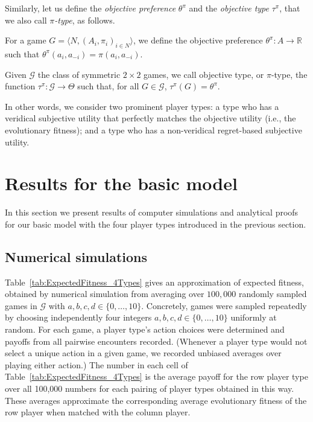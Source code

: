 \documentclass[fleqn,reqno,11pt]{article}
\begin{document}
\noindent Similarly, let us define the \textit{objective preference} $\theta^{\pi}$ and the \textit{objective type} $ \tau^{\pi} $, that we also call $\pi$\textit{-type}, as follows. 

\begin{definition} \label{defn:objpref}

For a game $ G=\langle N, (A_i , \pi_i)_{i \in N} \rangle $, we define the objective preference $ \theta^{\pi}: A \rightarrow \mathbb{R} $ such that $ \theta^{\pi}(a_i,a_{-i})=\pi(a_i,a_{-i}) $.

\end{definition}


\begin{definition} \label{defn:objtype}

Given $ \mathcal{G} $ the class of symmetric $ 2 \times 2 $ games, we call objective type, or $\pi$-type, the function $\tau^{\pi}: \mathcal{G} \rightarrow  \Theta$ such that, for all $G \in \mathcal{G}$, $ \tau^{\pi}(G)= \theta^{\pi}$.

\end{definition}

\noindent In other words, we consider two prominent player types: a type who has a veridical subjective utility that perfectly matches the objective utility (i.e., the evolutionary fitness); and a type who has a non-veridical regret-based subjective utility. 


\section{Results for the basic model}
\label{sec:results:-basic-model}


In this section we present results of computer simulations and analytical proofs for our basic
model with the four player types introduced in the previous section. 

\subsection{Numerical simulations}
\label{sec:numer-simul}

Table~\ref{tab:ExpectedFitness_4Types} gives an approximation of expected fitness, obtained by
numerical simulation from averaging over $100,000$ randomly sampled games in $\mathcal{G}$ with
$a,b,c,d \in \lbrace 0, \dots, 10 \rbrace$. Concretely, games were sampled repeatedly by
choosing independently four integers $a,b,c,d \in \lbrace 0, \dots, 10 \rbrace$ uniformly at
random. For each game, a player type's action choices were determined and payoffs from all
pairwise encounters recorded. (Whenever a player type would not select a unique action in a
given game, we recorded unbiased averages over playing either action.) The number in each cell
of Table~\ref{tab:ExpectedFitness_4Types} is the average payoff for the row player type over
all 100,000 numbers for each pairing of player types obtained in this way. These averages
approximate the corresponding average evolutionary fitness of the row player when matched with
the column player.
\end{document}
